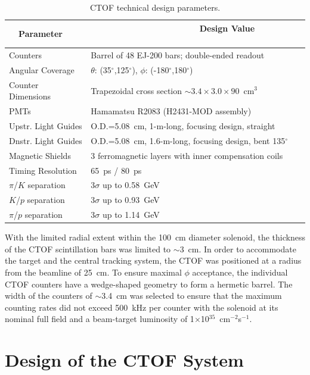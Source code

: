\documentclass{elsart}
\begin{document}
\begin{table}[htbp]
\begin{center}
\begin{tabular} {ll} \hline
~~Parameter~~ &~~~~~~~~~~~~~~~~~~~~~~ Design Value ~~~~~~~~~~\\ \hline
Counters             & Barrel of 48 EJ-200 bars; double-ended readout \\
Angular Coverage     & $\theta$: (35$^\circ$,125$^\circ$), $\phi$: (-180$^\circ$,180$^\circ$) \\
Counter Dimensions   & Trapezoidal cross section $\sim 3.4 \times 3.0 \times 90$~cm$^3$ \\
PMTs                 & Hamamatsu R2083 (H2431-MOD assembly)    \\
Upstr. Light Guides  & O.D.=5.08~cm, 1-m-long, focusing design, straight \\
Dnstr. Light Guides  & O.D.=5.08~cm, 1.6-m-long, focusing design, bent 135$^\circ$ \\
Magnetic Shields     & 3 ferromagnetic layers with inner compensation coils \\
Timing Resolution    & 65~ps / 80~ps\\
$\pi$/$K$ separation & 3$\sigma$ up to 0.58~GeV \\ 
$K$/$p$ separation   & 3$\sigma$ up to 0.93~GeV \\ 
$\pi$/$p$ separation & 3$\sigma$ up to 1.14~GeV \\ \hline
\end{tabular}
\end{center}
\caption{CTOF technical design parameters.}
\label{spec-table}
\end{table}

With the limited radial extent within the 100~cm diameter solenoid, the thickness of the CTOF
scintillation bars was limited to $\sim$3~cm. In order to accommodate the target and the central
tracking system, the CTOF was positioned at a radius from the beamline of 25~cm. To ensure maximal
$\phi$ acceptance, the individual CTOF counters have a wedge-shaped geometry to form a hermetic
barrel. The width of the counters of $\sim$3.4~cm was selected to ensure that the maximum counting
rates did not exceed 500~kHz per counter with the solenoid at its nominal full field and a 
beam-target luminosity of 1$\times$10$^{35}$~cm$^{-2}$s$^{-1}$.

\section{Design of the CTOF System}
\label{sec:design}
\end{document}
